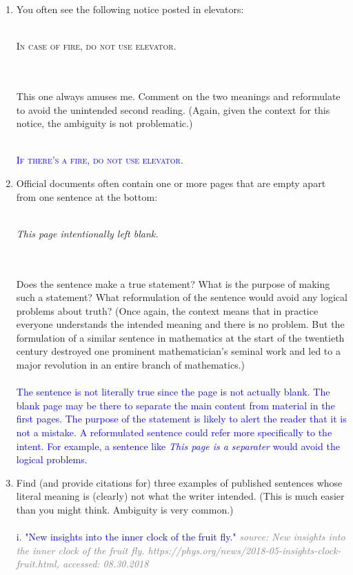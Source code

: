 \documentclass[13.5pt]{article}
\begin{document}
\begin{enumerate}
\item{You often see the following notice posted in elevators:}\\\\
\centerline{\textsc{In case of fire, do not use elevator.}}\\\\
{This one always amuses me. Comment on the two meanings and reformulate to avoid the unintended
second reading. (Again, given the context for this notice, the ambiguity is not problematic.)}\\\\
\textcolor{blue}{\centerline{\textsc{If there's a fire, do not use elevator.}}}

\item{Official documents often contain one or more pages that are empty apart from one sentence at the
bottom:}\\\\
\centerline{\textit{This page intentionally left blank.}}\\\\
{Does the sentence make a true statement? What is the purpose of making such a statement?
What reformulation of the sentence would avoid any logical problems about truth? (Once again,
the context means that in practice everyone understands the intended meaning and there is no
problem. But the formulation of a similar sentence in mathematics at the start of the twentieth
century destroyed one prominent mathematician's seminal work and led to a major revolution in
an entire branch of mathematics.)
}\\\\
\textcolor{blue}{The sentence is not literally true since the page is not actually blank. The blank page may be there to separate the main content from material in the first pages. The purpose of the statement is likely to alert the reader that it is not a mistake. A reformulated sentence could refer more specifically to the intent. For example, a sentence like \textit{This page is a separater} would avoid the logical problems.}
\item{Find (and provide citations for) three examples of published sentences whose literal meaning is
(clearly) not what the writer intended. (This is much easier than you might think. Ambiguity is
very common.)}\\\\
\textcolor{blue}{i. "New insights into the inner clock of the fruit fly."}
\textcolor{gray}{\textit{source: New insights into the inner clock of the fruit fly. https://phys.org/news/2018-05-insights-clock-fruit.html, accessed: 08.30.2018}}\\\\

\end{enumerate}
\end{document}

